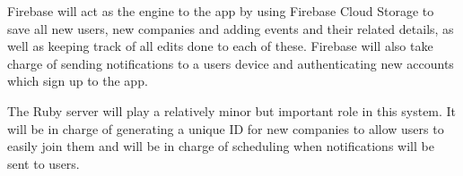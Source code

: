 Firebase will act as the engine to the app by using Firebase Cloud Storage to save all new users, new companies and adding events and their related details, as well as keeping track of all edits done to each of these. Firebase will also take charge of sending notifications to a users device and authenticating new accounts which sign up to the app.

The Ruby server will play a relatively minor but important role in this system. It will be in charge of generating a unique ID for new companies to allow users to easily join them and will be in charge of scheduling when notifications will be sent to users.





